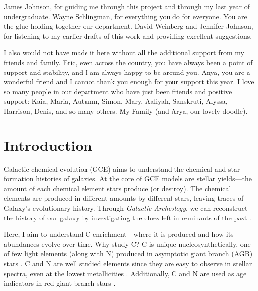 \documentclass[12pt,oneside]{report}
\begin{document}
James Johnson, for guiding me through this project and through my last year of undergraduate.
Wayne Schlingman, for everything you do for everyone. You are the glue holding together our department.
David Weinberg and Jennifer Johnson, for listening to my earlier drafts of this work and providing excellent suggestions.

I also would not have made it here without all the additional support from my friends and family. Eric, even across the country, you have always been a point of support and stability, and I am always happy to be around you. Anya, you are a wonderful friend and I cannot thank you enough for your support this year. 
I love so many people in our department who have just been friends and positive support: Kaia, Maria, Autumn, Simon, Mary, Aaliyah, Sanskruti, Alyssa, Harrison, Denis, and so many others. 
My Family (and Arya, our lovely doodle).


\tableofcontents
\listoffigures
\listoftables
\newpage
{}



\chapter{Introduction}

Galactic chemical evolution (GCE) aims to understand the chemical and star formation histories of galaxies. At the core of GCE models are stellar yields---the amount of each chemical element stars produce (or destroy). The chemical elements are produced in different amounts by different stars, leaving traces of Galaxy's evolutionary history. Through \textit{Galactic Archeology}, we can reconstruct the history of our galaxy by investigating the clues left in reminants of the past \citep{Weinberg+22, emily+19}.

Here, I aim to understand C enrichment---where it is produced and how its abundances evolve over time. Why study C? C is unique nucleosynthetically, one of few light elements (along with N) produced in asymptotic giant branch (AGB) stars \citep[e.g.][]{jennifer19, KL14}. C and N are well studied elements since they are easy to observe in stellar spectra, even at the lowest metallicities \cite[e.g.][]{fabbian+09, nissen+14, lambert81, laird85, lambert86}. Additionally, C and N are used as age indicators in red giant branch stars \citep{martig16, MG15, hasselquist19, fiorenzo+21}.
\end{document}
